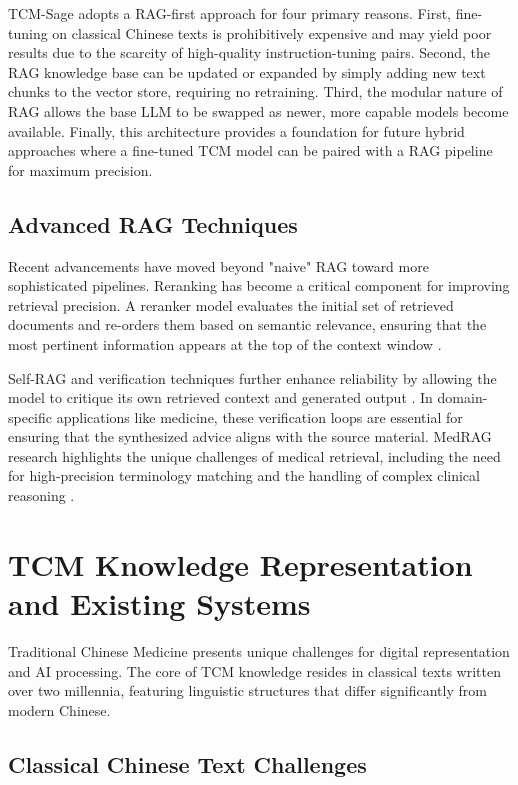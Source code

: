 TCM-Sage adopts a RAG-first approach for four primary reasons. First, fine-tuning on classical Chinese texts is prohibitively expensive and may yield poor results due to the scarcity of high-quality instruction-tuning pairs. Second, the RAG knowledge base can be updated or expanded by simply adding new text chunks to the vector store, requiring no retraining. Third, the modular nature of RAG allows the base LLM to be swapped as newer, more capable models become available. Finally, this architecture provides a foundation for future hybrid approaches where a fine-tuned TCM model can be paired with a RAG pipeline for maximum precision.

\subsection{Advanced RAG Techniques}

Recent advancements have moved beyond "naive" RAG toward more sophisticated pipelines. Reranking has become a critical component for improving retrieval precision. A reranker model evaluates the initial set of retrieved documents and re-orders them based on semantic relevance, ensuring that the most pertinent information appears at the top of the context window \cite{gao2024rag}.

Self-RAG and verification techniques further enhance reliability by allowing the model to critique its own retrieved context and generated output \cite{asai2024selfrag}. In domain-specific applications like medicine, these verification loops are essential for ensuring that the synthesized advice aligns with the source material. MedRAG research highlights the unique challenges of medical retrieval, including the need for high-precision terminology matching and the handling of complex clinical reasoning \cite{xiong2024medrag}.

\section{TCM Knowledge Representation and Existing Systems}

Traditional Chinese Medicine presents unique challenges for digital representation and AI processing. The core of TCM knowledge resides in classical texts written over two millennia, featuring linguistic structures that differ significantly from modern Chinese.

\subsection{Classical Chinese Text Challenges}

